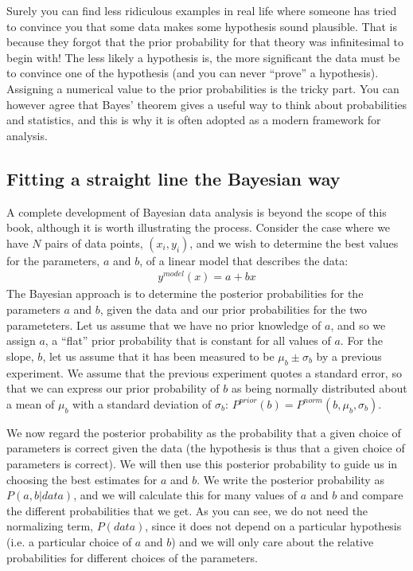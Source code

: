 Surely you can find less ridiculous examples in real life where someone has tried to convince you that some data makes some hypothesis sound plausible. That is because they forgot that the prior probability for that theory was infinitesimal to begin with! The less likely a hypothesis is, the more significant the data must be to convince one of the hypothesis (and you can never ``prove'' a hypothesis). Assigning a numerical value to the prior probabilities is the tricky part. You can however agree that Bayes' theorem  gives a useful way to think about probabilities and statistics, and this is why it is often adopted as a modern framework for analysis.

\subsection{Fitting a straight line the Bayesian way}
A complete development of Bayesian data analysis is beyond the scope of this book, although it is worth illustrating the process. Consider the case where we have $N$ pairs of data points, $(x_i,y_i)$, and we wish to determine the best values for the parameters, $a$ and $b$, of a linear model that describes the data:
\begin{align*}
y^{model}(x) = a+bx
\end{align*}
The Bayesian approach is to determine the posterior probabilities for the parameters $a$ and $b$, given the data and our prior probabilities for the two parameteters. Let us assume that we have no prior knowledge of $a$, and so we assign $a$, a ``flat'' prior probability that is constant for all values of $a$.  For the slope, $b$, let us assume that it has been measured to be  $\mu_b\pm\sigma_b$ by a previous experiment. We assume that the previous experiment quotes a standard error, so that we can express our prior probability of $b$ as being normally distributed about a mean of $\mu_b$ with a standard deviation of $\sigma_b$: $P^{prior}(b)=P^{norm}(b,\mu_b,\sigma_b)$.

We now regard the posterior probability as the probability that a given choice of parameters is correct given the data (the hypothesis is thus that a given choice of parameters is correct). We will then use this posterior probability to guide us in choosing the best estimates for $a$ and $b$. We write the posterior probability as $P(a,b|data)$, and we will calculate this for many values of $a$ and $b$ and compare the different probabilities that we get. As you can see, we do not need the normalizing term, $P(data)$, since it does not depend on a particular hypothesis (i.e. a particular choice of $a$ and $b$) and we will only care about the relative probabilities for different choices of the parameters.

